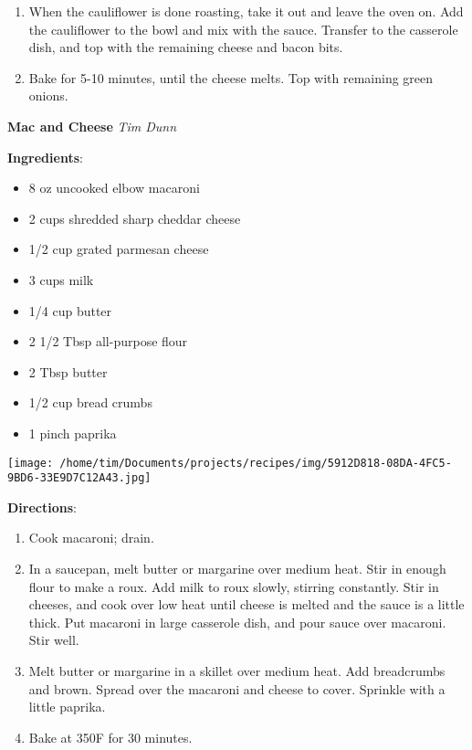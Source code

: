 \documentclass[11pt, twoside, openany]{book}
\begin{document}
\begin{minipage}[t]{\linewidth}
\begin{enumerate}
\item When the cauliflower is done roasting, take it out and leave the oven on. Add the cauliflower to the bowl and mix with the sauce. Transfer to the casserole dish, and top with the remaining cheese and bacon bits.
\item Bake for 5-10 minutes, until the cheese melts. Top with remaining green onions.
\end{enumerate}
\end{minipage}\vspace{8mm}
\noindent\begin{minipage}[t]{\linewidth}%
{\Large\textbf{Mac and Cheese}} \label{mac-and-cheese}\hfill\textit{Tim Dunn}\\
\noindent\begin{minipage}[t]{0.78\linewidth}%
\textbf{Ingredients}:\vspace{-3mm}
\begin{multicols}{2}
\begin{itemize}\setlength\itemsep{-1mm}
\item 8 oz uncooked elbow macaroni
\item 2 cups shredded sharp cheddar cheese
\item 1/2 cup grated parmesan cheese
\item 3 cups milk
\item 1/4 cup butter
\item 2 1/2 Tbsp all-purpose flour
\item 2 Tbsp butter
\item 1/2 cup bread crumbs
\item 1 pinch paprika
\end{itemize}
\end{multicols}
\end{minipage}
\noindent\begin{minipage}[t]{0.18\linewidth}
\centering \strut\vspace*{-\baselineskip}\newline
\texttt{[image: /home/tim/Documents/projects/recipes/img/5912D818-08DA-4FC5-9BD6-33E9D7C12A43.jpg]}\\
\end{minipage}\vspace{3mm}
\textbf{Directions}:
\vspace{-3mm}\begin{enumerate}\setlength\itemsep{-1mm}
\item Cook macaroni; drain.
\item In a saucepan, melt butter or margarine over medium heat. Stir in enough flour to make a roux. Add milk to roux slowly, stirring constantly. Stir in cheeses, and cook over low heat until cheese is melted and the sauce is a little thick. Put macaroni in large casserole dish, and pour sauce over macaroni. Stir well.
\item Melt butter or margarine in a skillet over medium heat. Add breadcrumbs and brown. Spread over the macaroni and cheese to cover. Sprinkle with a little paprika.
\item Bake at 350F for 30 minutes.
\end{enumerate}
\end{minipage}\vspace{8mm}
\end{document}
